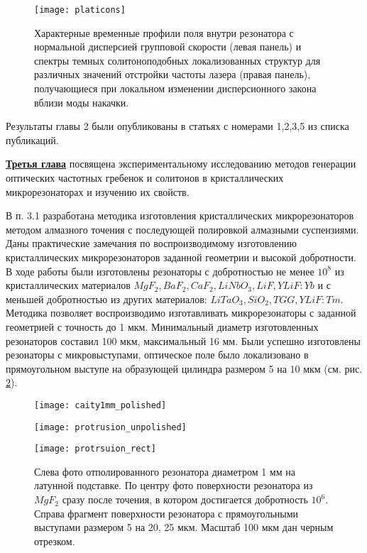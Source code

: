 \begin{figure}
  \centering
  \texttt{[image: platicons]}
  \caption{Характерные временные профили поля внутри резонатора с нормальной дисперсией групповой скорости (левая панель) и спектры темных солитоноподобных локализованных структур для различных значений отстройки частоты лазера (правая панель), получающиеся при локальном изменении дисперсионного закона вблизи моды накачки.}
  \label{platicons}
\end{figure}

Результаты главы 2 были опубликованы в статьях с номерами 1,2,3,5 из списка публикаций.

\underline{\textbf{Третья глава}} посвящена экспериментальному исследованию методов генерации оптических частотных гребенок и солитонов в кристаллических микрорезонаторах и изучению их свойств.

В п. 3.1 разработана методика изготовления кристаллических микрорезонаторов методом алмазного точения с последующей полировкой алмазными суспензиями. Даны практические замечания по воспроизводимому изготовлению кристаллических микрорезонаторов заданной геометрии и высокой добротности. В ходе работы были изготовлены резонаторы с добротностью не менее $10^8$ из кристаллических материалов $MgF_2,BaF_2,CaF_2,LiNbO_3,LiF,YLiF:Yb$ и с меньшей добротностью из других материалов: $LiTaO_3,SiO_2,TGG,YLiF:Tm$. Методика позволяет воспроизводимо изготавливать микрорезонаторы с заданной геометрией с точность до 1 мкм. Минимальный диаметр изготовленных резонаторов составил 100 мкм, максимальный 16 мм. Были успешно изготовлены резонаторы с микровыступами, оптическое поле было локализовано в прямоугольном выступе на образующей цилиндра размером 5 на 10 мкм (см. рис. \ref{cavity_polished}).

\begin{figure}[ht]
  \begin{minipage}[ht]{0.32\linewidth}\centering
    \texttt{[image: caity1mm\_polished]}
  \end{minipage}
  \hfill
  \begin{minipage}[ht]{0.32\linewidth}\centering
    \texttt{[image: protrusion\_unpolished]}
  \end{minipage}
  \hfill
  \begin{minipage}[ht]{0.32\linewidth}\centering
    \texttt{[image: protrsuion\_rect]}
  \end{minipage}
  \caption{Слева фото отполированного резонатора диаметром 1 мм на латунной подставке. По центру фото поверхности резонатора из $MgF_2$ сразу после точения, в котором достигается добротность $10^6$. Справа фрагмент поверхности резонатора с прямоугольными выступами размером 5 на 20, 25 мкм. Масштаб 100 мкм дан черным отрезком.}
  \label{cavity_polished}
\end{figure}


